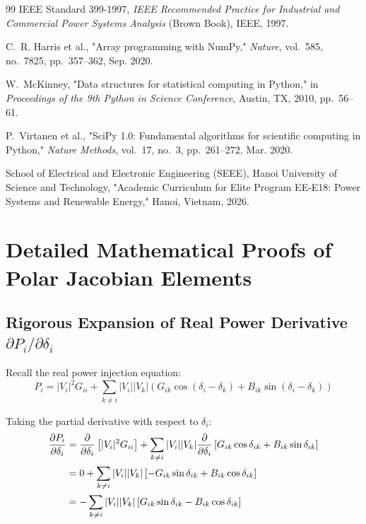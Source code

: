 \documentclass[12pt,a4paper,oneside]{report}
\begin{document}
\begin{thebibliography}{99}
IEEE Standard 399-1997, \textit{IEEE Recommended Practice for Industrial and Commercial Power Systems Analysis} (Brown Book), IEEE, 1997.

C.~R. Harris et al., "Array programming with NumPy," \textit{Nature}, vol.~585, no.~7825, pp.~357--362, Sep. 2020.

W.~McKinney, "Data structures for statistical computing in Python," in \textit{Proceedings of the 9th Python in Science Conference}, Austin, TX, 2010, pp.~56--61.

P.~Virtanen et al., "SciPy 1.0: Fundamental algorithms for scientific computing in Python," \textit{Nature Methods}, vol.~17, no.~3, pp.~261--272, Mar. 2020.

School of Electrical and Electronic Engineering (SEEE), Hanoi University of Science and Technology, "Academic Curriculum for Elite Program EE-E18: Power Systems and Renewable Energy," Hanoi, Vietnam, 2026.

\end{thebibliography}

\appendix

\chapter{Detailed Mathematical Proofs of Polar Jacobian Elements}

\section{\texorpdfstring{Rigorous Expansion of Real Power Derivative $\partial P_i / \partial \delta_i$}{Rigorous Expansion of Real Power Derivative dPi / ddelta_i}}
Recall the real power injection equation:
\begin{equation}
P_i = |V_i|^2 G_{ii} + \sum_{k \neq i} |V_i| |V_k| \left( G_{ik} \cos(\delta_i - \delta_k) + B_{ik} \sin(\delta_i - \delta_k) \right)
\end{equation}

Taking the partial derivative with respect to $\delta_i$:
\begin{align}
\frac{\partial P_i}{\partial \delta_i} &= \frac{\partial}{\partial \delta_i} \left[ |V_i|^2 G_{ii} \right] + \sum_{k \neq i} |V_i| |V_k| \frac{\partial}{\partial \delta_i} \left[ G_{ik} \cos\delta_{ik} + B_{ik} \sin\delta_{ik} \right] \notag \\
&= 0 + \sum_{k \neq i} |V_i| |V_k| \left[ -G_{ik} \sin\delta_{ik} + B_{ik} \cos\delta_{ik} \right] \notag \\
&= - \sum_{k \neq i} |V_i| |V_k| \left[ G_{ik} \sin\delta_{ik} - B_{ik} \cos\delta_{ik} \right]
\end{align}
\end{document}
